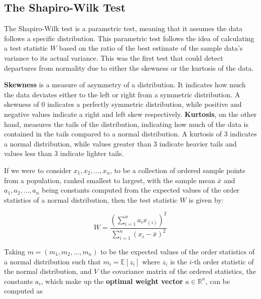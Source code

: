 \documentclass[12pt]{article}
\begin{document}

\subsection{The Shapiro-Wilk Test}\label{ShapiroWilk}

The Shapiro-Wilk test \cite{Shapiro1965} is a parametric test, meaning that it assumes the data follows a specific distribution. This parametric test follows the idea of calculating a test statistic $W$ based on the ratio of the best estimate of the sample data's variance to its actual variance. This was the first test that could detect departures from normality due to either the skewness or the kurtosis of the data.

\medskip
\noindent\textbf{Skewness} is a measure of asymmetry of a distribution. It indicates how much the data deviates either to the left or right from a symmetric distribution. A skewness of 0 indicates a perfectly symmetric distribution, while positive and negative values indicate a right and left skew respectively. \textbf{Kurtosis}, on the other hand, measures the tails of the distribution, indicating how much of the data is contained in the tails compared to a normal distribution. A kurtosis of 3 indicates a normal distribution, while values greater than 3 indicate heavier tails and values less than 3 indicate lighter tails.

\pagebreak
\noindent If we were to consider $x_1, x_2, \ldots, x_n$, to be a collection of ordered sample points from a population, ranked smallest to largest, with the sample mean $\bar{x}$ and $a_1, a_2, \ldots, a_n$ being constants computed from the expected values of the order statistics of a normal distribution, then the test statistic $W$ is given by:

\begin{equation}
    W = \frac{(\sum\limits_{i=1}^{n} a_i x_{(i)})^2}{\sum\limits_{i=1}^{n} (x_i - \bar{x})^2}
    \label{eq:shapiro_wilk_statistic}
\end{equation}

\medskip
\noindent Taking $m = (m_1, m_2, \ldots, m_n)$ to be the expected values of the order statistics of a normal distribution such that $m_i = \mathbb{E}[z_i]$ where $z_i$ is the $i$-th order statistic of the normal distribution, and $V$ the covariance matrix of the ordered statistics, the constants $a_i$, which make up the \textbf{optimal weight vector} $a \in \mathbb{R}^n$, can be computed as
\end{document}
